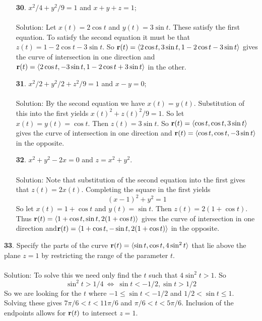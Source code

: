 \documentclass[12pt]{amsbook}
\newcommand{\la}{\langle}
\newcommand{\ra}{\rangle}
\begin{document}
\begin{enumerate}
  \\
  \\
  {\sc Solution}: Let $x(t)=t$. Then $y(t)=t^2$ and $z(t)=x(t)^2+y(t)^2=t^2+t^4$. So ${\bf r}(t)=\la t, t, t^2+t^4 \ra$ gives the curve of intersection in one direction and ${\bf r}(t)=\la -t, t^2, t^2+t^4 \ra$ in the other.
  \\
  \item[{\small\bf 30}.] $x^2/4+y^2/9=1$ and $x+y+z=1$;
  \\
  \\
  {\sc Solution}: Let $x(t)=2\cos t$ and $y(t)=3\sin t$. These satisfy the first equation. To satisfy the second equation it must be that $z(t)=1-2\cos t -3\sin t$. So ${\bf r}(t)=\la 2\cos t, 3\sin t, 1-2\cos t-3\sin t \ra$ gives the curve of intersection in one direction and ${\bf r}(t)=\la 2\cos t, -3\sin t, 1-2\cos t+3\sin t \ra$ in the other.
  \\
  \item[{\small\bf 31}.] $x^2/2+y^2/2+z^2/9=1$ and $x-y=0$;
  \\
  \\
  {\sc Solution}: By the second equation we have $x(t)=y(t)$. Substitution of this into the first yields $x(t)^2+z(t)^2/9=1$. So let $x(t)=y(t)=\cos t$. Then $z(t)=3\sin t$. So ${\bf r}(t)=\la \cos t, \cos t, 3\sin t \ra$ gives the curve of intersection in one direction and ${\bf r}(t)=\la \cos t, \cos t, -3\sin t \ra$ in the opposite.
  \\
  \item[{\small\bf 32}.] $x^2+y^2-2x=0$ and $z=x^2+y^2$.
  \\
  \\
  {\sc Solution}: Note that substitution of the second equation into the first gives that $z(t)=2x(t)$. Completing the square in the first yields
$$(x-1)^2+y^2=1$$
So let $x(t)=1+\cos t$ and $y(t)=\sin t$. Then $z(t)=2(1+\cos t)$. Thus ${\bf r}(t)=\la 1+\cos t, \sin t, 2(1+\cos t) \ra$ gives the curve of intersection in one direction and${\bf r}(t)=\la 1+\cos t, -\sin t, 2(1+\cos t) \ra$ in the opposite.
\end{enumerate}
{\small\bf 33}. Specify the parts of the curve ${\bf r}(t) = \la \sin t, \cos t, 4 \sin^2 t \ra$ that lie above the plane $z = 1$ by restricting the range of the parameter $t$.
\\
\\
{\sc Solution}: To solve this we need only find the $t$ such that $4\sin^2 t> 1$. So 
$$\sin^2 t> 1/4 \ \Leftrightarrow \ \sin t <-1/2, \sin t>1/2$$
So we are looking for the $t$ where $-1\leq \sin t < -1/2$ and $1/2< \sin t \leq 1$. Solving these gives $7\pi/6 <t<11\pi/6$ and $\pi/6 < t< 5\pi/6$. Inclusion of the endpoints allows for ${\bf r}(t)$ to intersect $z=1$. 
\end{document}
